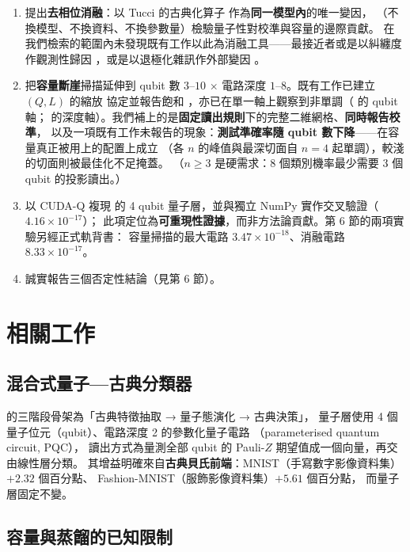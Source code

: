 \documentclass[11pt,a4paper]{ctexart}
\begin{document}
\begin{enumerate}
\item
  提出\textbf{去相位消融}：以 Tucci 的古典化算子 \cite{tucci2012}
  作為\textbf{同一模型內}的唯一變因，
  （不換模型、不換資料、不換參數量）檢驗量子性對校準與容量的邊際貢獻。
  在我們檢索的範圍內未發現既有工作以此為消融工具------最接近者或是以糾纏度作觀測性歸因
  \cite{nausheen2026}，或是以退極化雜訊作外部變因 \cite{ghosh2026}。
\item
  把\textbf{容量斷崖}掃描延伸到 qubit 數 \(3\)--\(10\) \(\times\)
  電路深度 \(1\)--\(8\)。既有工作已建立 \((Q,L)\) 的縮放 協定並報告飽和
  \cite{vyskubov2026}，亦已在單一軸上觀察到非單調（\cite{le2025} 的 qubit
  軸； \cite{zhang2021suppression}
  的深度軸）。我們補上的是\textbf{固定讀出規則}下的完整二維網格、\textbf{同時報告校準}，
  以及一項既有工作未報告的現象：\textbf{測試準確率隨 qubit
  數下降}------在容量真正被用上的配置上成立 （各 \(n\)
  的峰值與最深切面自 \(n = 4\) 起單調），較淺的切面則被最佳化不足掩蓋。
  （\(n \geq 3\) 是硬需求：8 個類別機率最少需要 3 個 qubit
  的投影讀出。）
\item
  以 CUDA-Q 複現 \cite{wang2026} 的 4 qubit 量子層，並與獨立 NumPy
  實作交叉驗證（\(4.16 \times 10^{- 17}\)）；
  此項定位為\textbf{可重現性證據}，而非方法論貢獻。第 6
  節的兩項實驗另經正式軌背書： 容量掃描的最大電路
  \(3.47 \times 10^{- 18}\)、消融電路 \(8.33 \times 10^{- 17}\)。
\item
  誠實報告三個否定性結論（見第 6 節）。
\end{enumerate}

\section{相關工作}

\subsection{混合式量子---古典分類器}

\cite{wang2026} 的三階段骨架為「古典特徵抽取 → 量子態演化 → 古典決策」，
量子層使用 4 個量子位元（qubit）、電路深度 2 的參數化量子電路
（parameterised quantum circuit, PQC）， 讀出方式為量測全部 qubit 的
Pauli-\(Z\) 期望值成一個向量，再交由線性層分類。
其增益明確來自\textbf{古典貝氏前端}：MNIST（手寫數字影像資料集）\(+ 2.32\)
個百分點、 Fashion-MNIST（服飾影像資料集）\(+ 5.61\) 個百分點，
而量子層固定不變。

\subsection{容量與蒸餾的已知限制}
\end{document}
